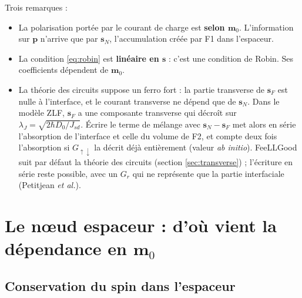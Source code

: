 \documentclass[11pt,a4paper]{article}
\newcommand{\vm}{\bm{m}}
\newcommand{\vp}{\bm{p}}
\newcommand{\vs}{\bm{s}}
\begin{document}
Trois remarques :
\begin{itemize}
  \item La polarisation portée par le courant de charge est \textbf{selon
    $\vm_0$}. L'information sur $\vp$ n'arrive que par $\vs_N$,
    l'accumulation créée par F1 dans l'espaceur.
  \item La condition \eqref{eq:robin} est \textbf{linéaire en $\vs$} : c'est
    une condition de Robin. Ses coefficients dépendent de $\vm_0$.
  \item La théorie des circuits suppose un ferro fort : la partie
    transverse de $\vs_F$ est nulle à l'interface, et le courant transverse
    ne dépend que de $\vs_N$. Dans le modèle ZLF, $\vs_F$ a une composante
    transverse qui décroît sur $\lambda_J=\sqrt{2\hbar D_0/J_{sd}}$. Écrire le
    terme de mélange avec $\vs_N-\vs_F$ met alors en série l'absorption de
    l'interface et celle du volume de F2, et compte deux fois l'absorption
    si $G_{\uparrow\downarrow}$ la décrit déjà entièrement (valeur \emph{ab
    initio}). FeeLLGood suit par défaut la théorie des circuits (section
    \ref{sec:transverse}) ; l'écriture en série reste possible, avec un
    $G_r$ qui ne représente que la partie interfaciale (Petitjean
    \emph{et al.}).
\end{itemize}

\section{Le nœud espaceur : d'où vient la dépendance en \texorpdfstring{$\vm_0$}{m0}}

\subsection{Conservation du spin dans l'espaceur}
\end{document}
